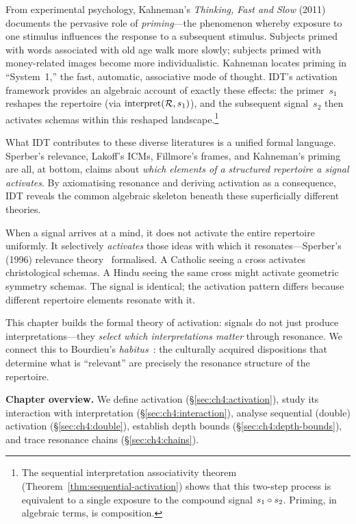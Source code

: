 From experimental psychology, Kahneman's \emph{Thinking, Fast and
Slow} (2011)~\cite{kahneman2011} documents the pervasive role of
\emph{priming}---the phenomenon whereby exposure to one stimulus
influences the response to a subsequent stimulus.  Subjects primed
with words associated with old age walk more slowly; subjects primed
with money-related images become more individualistic.  Kahneman
locates priming in ``System~1,'' the fast, automatic, associative mode
of thought.  IDT's activation framework provides an algebraic account
of exactly these effects: the primer~$s_1$ reshapes the repertoire
(via $\operatorname{interpret}(\mathcal{R}, s_1)$), and the subsequent
signal~$s_2$ then activates schemas within this reshaped
landscape.\footnote{The sequential interpretation associativity
theorem (Theorem~\ref{thm:sequential-activation}) shows that this
two-step process is equivalent to a single exposure to the compound
signal $s_1 \circ s_2$.  Priming, in algebraic terms, is
composition.}

What IDT contributes to these diverse literatures is a unified formal
language.  Sperber's relevance, Lakoff's ICMs, Fillmore's frames, and
Kahneman's priming are all, at bottom, claims about \emph{which
elements of a structured repertoire a signal activates}.  By
axiomatising resonance and deriving activation as a consequence, IDT
reveals the common algebraic skeleton beneath these superficially
different theories.

When a signal arrives at a mind, it does not activate the entire
repertoire uniformly.  It selectively \emph{activates} those ideas with
which it resonates---Sperber's (1996) relevance theory~\cite{sperber1996}
formalised.  A Catholic seeing a cross activates christological schemas.
A Hindu seeing the same cross might activate geometric symmetry schemas.
The signal is identical; the activation pattern differs because different
repertoire elements resonate with it.

This chapter builds the formal theory of activation: signals do not just
produce interpretations---they \emph{select which interpretations
matter} through resonance.  We connect this to Bourdieu's
\emph{habitus}~\cite{bourdieu1984}: the culturally acquired dispositions
that determine what is ``relevant'' are precisely the resonance structure
of the repertoire.

\medskip
\noindent\textbf{Chapter overview.}  We define activation
(\S\ref{sec:ch4:activation}), study its interaction with interpretation
(\S\ref{sec:ch4:interaction}), analyse sequential (double) activation
(\S\ref{sec:ch4:double}), establish depth bounds
(\S\ref{sec:ch4:depth-bounds}), and trace resonance chains
(\S\ref{sec:ch4:chains}).

